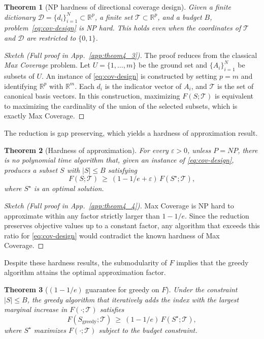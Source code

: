 \documentclass[accepted]{uai2026}
\theoremstyle{plain}
\newtheorem{theorem}{Theorem}[section]
\theoremstyle{definition}
\theoremstyle{remark}
\newcommand{\R}{\mathbb{R}}
\begin{document}
\begin{theorem}[NP hardness of directional coverage design]\label{thm:np-hard}
Given a finite dictionary $\mathcal D=\{d_i\}_{i=1}^N\subset\R^p$, a finite set $\mathcal T\subset\R^p$, and a budget $B$, problem~\eqref{eq:cov-design} is NP hard. This holds even when the coordinates of $\mathcal T$ and $\mathcal D$ are restricted to $\{0,1\}$.
\end{theorem}

\begin{proof}[\textit{Sketch (Full proof in App.~\ref{app:theom4_3})}]
The proof reduces from the classical \emph{Max Coverage} problem. Let $U=\{1,\dots,m\}$ be the ground set and $\{A_i\}_{i=1}^N$ be subsets of $U$. An instance of \eqref{eq:cov-design} is constructed by setting $p=m$ and identifying $\R^p$ with $\R^m$. Each $d_i$ is the indicator vector of $A_i$, and $\mathcal T$ is the set of canonical basis vectors. In this construction, maximizing $F(S;\mathcal T)$ is equivalent to maximizing the cardinality of the union of the selected subsets, which is exactly Max Coverage.
\end{proof}

The reduction is gap preserving, which yields a hardness of approximation result.

\begin{theorem}[Hardness of approximation]\label{thm:hardness-approx}
For every $\varepsilon>0$, unless $P=NP$, there is no polynomial time algorithm that, given an instance of \eqref{eq:cov-design}, produces a subset $S$ with $|S|\le B$ satisfying
\[
F(S;\mathcal T)\ \ge\ (1-1/e+\varepsilon)\,F(S^\star;\mathcal T),
\]
where $S^\star$ is an optimal solution.
\end{theorem}

\begin{proof}[\textit{Sketch (Full proof in App.~\ref{app:theom4_4})}]
Max Coverage is NP hard to approximate within any factor strictly larger than $1-1/e$. Since the reduction preserves objective values up to a constant factor, any algorithm that exceeds this ratio for \eqref{eq:cov-design} would contradict the known hardness of Max Coverage.
\end{proof}

Despite these hardness results, the submodularity of $F$ implies that the greedy algorithm attains the optimal approximation factor.

\begin{theorem}[$(1-1/e)$ guarantee for greedy on $F$]\label{thm:greedy}
Under the constraint $|S|\le B$, the greedy algorithm that iteratively adds the index with the largest marginal increase in $F(\cdot;\mathcal{T})$ satisfies
\[
F(S_{\mathrm{greedy}};\mathcal{T})\ \ge\ (1-1/e)\,F(S^\star;\mathcal{T}),
\]
where $S^\star$ maximizes $F(\cdot;\mathcal{T})$ subject to the budget constraint.
\end{theorem}
\end{document}
